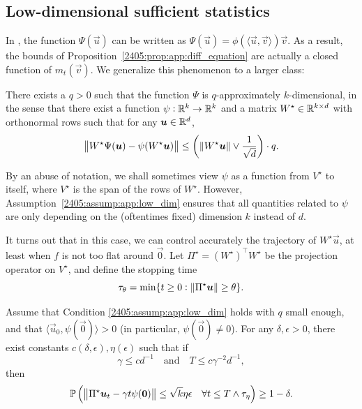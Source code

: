 \subsection{Low-dimensional sufficient statistics}

In \cite{arous2021online}, the function $\Psi(\vec{u})$ can be written as $\Psi(\vec{u}) = \phi(\langle \vec{u}, \vec{v} \rangle)\vec{v}$. As a result, the bounds of Proposition~\ref{2405:prop:app:diff_equation} are actually a closed function of $m_t(\vec{v})$. We generalize this phenomenon to a larger class:

\begin{assumption}\label{2405:assump:app:low_dim}
  There exists a $q > 0$ such that the function $\Psi$ is $q$-approximately $k$-dimensional, in the sense that there exist a function $\psi: \mathbb{R}^k \to \mathbb{R}^k$ and a matrix $W^\star \in \mathbb{R}^{k \times d}$ with orthonormal rows such that for any ${\boldsymbol{u}}\in\mathbb{R}^d$,
  \[ \left\lVert  W^\star \Psi({\boldsymbol{u}}) - \psi(W^\star {\boldsymbol{u}})\right\rVert \leq \left( \left\lVert W^\star {\boldsymbol{u}}\right\rVert \vee \frac1{\sqrt{d}} \right) \cdot q. \]
\end{assumption}

By an abuse of notation, we shall sometimes view $\psi$ as a function from $V^\star$ to itself, where $V^\star$ is the span of the rows of $W^\star$. However, Assumption~\ref{2405:assump:app:low_dim} ensures that all quantities related to $\psi$ are only depending on the (oftentimes fixed) dimension $k$ instead of $d$.

It turns out that in this case, we can control accurately the trajectory of $W^\star \vec{u}$, at least when $f$ is not too flat around $\vec{0}$. Let $\Pi^\star = (W^{\star})^{\top}W^\star$ be the projection operator on $V^\star$, and define the stopping time
\[ \tau_\theta = \min \{t \geq 0 : \left\lVert \Pi^\star {\boldsymbol{u}}\right\rVert \geq \theta \}. \]

\begin{proposition}\label{2405:prop:app:low_dim_linear}
  Assume that Condition \ref{2405:assump:app:low_dim} holds with $q$ small enough, and that $\langle \vec{u}_0, \psi(\vec{0}) \rangle > 0$ (in particular, $\psi(\vec{0}) \neq 0$). For any $\delta, \epsilon > 0$, there exist constants $c(\delta, \epsilon), \eta(\epsilon)$ such that if
  \begin{equation}
    \gamma \leq c d^{-1} \quad \text{and} \quad T \leq c  \gamma^{-2} d^{-1},
  \end{equation}
  then
  \begin{equation}
    \mathbb{P}\left(\left\lVert \Pi^\star {\boldsymbol{u}}_t - \gamma t \psi({\boldsymbol{0}})\right\rVert \leq \sqrt{k} \eta \epsilon \quad \forall t \leq T \wedge \tau_\eta \right) \geq 1 - \delta.
  \end{equation}
\end{proposition}


